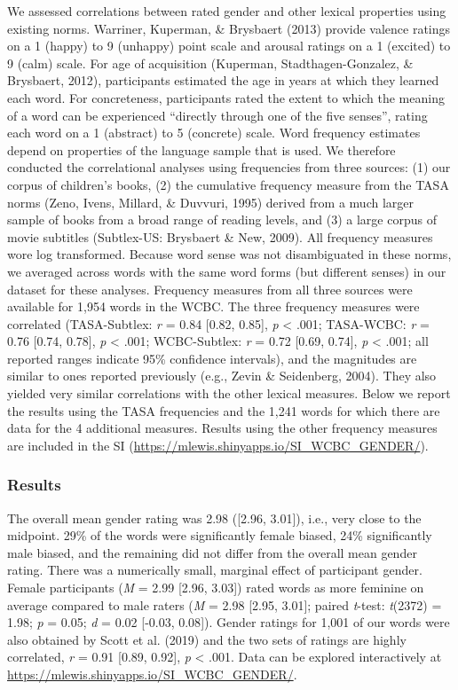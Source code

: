 \documentclass[
  english,
  ,man,floatsintext]{apa6}
\begin{document}
We assessed correlations between rated gender and other lexical properties using existing norms. Warriner, Kuperman, \& Brysbaert (2013) provide valence ratings on a 1 (happy) to 9 (unhappy) point scale and arousal ratings on a 1 (excited) to 9 (calm) scale. For age of acquisition (Kuperman, Stadthagen-Gonzalez, \& Brysbaert, 2012), participants estimated the age in years at which they learned each word. For concreteness, participants rated the extent to which the meaning of a word can be experienced \enquote{directly through one of the five senses}, rating each word on a 1 (abstract) to 5 (concrete) scale. Word frequency estimates depend on properties of the language sample that is used. We therefore conducted the correlational analyses using frequencies from three sources: (1) our corpus of children's books, (2) the cumulative frequency measure from the TASA norms (Zeno, Ivens, Millard, \& Duvvuri, 1995) derived from a much larger sample of books from a broad range of reading levels, and (3) a large corpus of movie subtitles (Subtlex-US: Brysbaert \& New, 2009). All frequency measures wore log transformed. Because word sense was not disambiguated in these norms, we averaged across words with the same word forms (but different senses) in our dataset for these analyses. Frequency measures from all three sources were available for 1,954 words in the WCBC. The three frequency measures were correlated (TASA-Subtlex: \emph{r} = 0.84 {[}0.82, 0.85{]}, \emph{p} \textless{} .001; TASA-WCBC: \emph{r} = 0.76 {[}0.74, 0.78{]}, \emph{p} \textless{} .001; WCBC-Subtlex: \emph{r} = 0.72 {[}0.69, 0.74{]}, \emph{p} \textless{} .001; all reported ranges indicate 95\% confidence intervals), and the magnitudes are similar to ones reported previously (e.g., Zevin \& Seidenberg, 2004). They also yielded very similar correlations with the other lexical measures. Below we report the results using the TASA frequencies and the 1,241 words for which there are data for the 4 additional measures. Results using the other frequency measures are included in the SI (\url{https://mlewis.shinyapps.io/SI_WCBC_GENDER/}).

\hypertarget{results}{%
\subsubsection{Results}\label{results}}

The overall mean gender rating was 2.98 ({[}2.96, 3.01{]}), i.e., very close to the midpoint. 29\% of the words were significantly female biased, 24\% significantly male biased, and the remaining did not differ from the overall mean gender rating. There was a numerically small, marginal effect of participant gender. Female participants (\emph{M} = 2.99 {[}2.96, 3.03{]}) rated words as more feminine on average compared to male raters (\emph{M} = 2.98 {[}2.95, 3.01{]}; paired \emph{t}-test: \emph{t}(2372) = 1.98; \emph{p} = 0.05; \emph{d} = 0.02 {[}-0.03, 0.08{]}). Gender ratings for 1,001 of our words were also obtained by Scott et al. (2019) and the two sets of ratings are highly correlated, \emph{r} = 0.91 {[}0.89, 0.92{]}, \emph{p} \textless{} .001. Data can be explored interactively at \url{https://mlewis.shinyapps.io/SI_WCBC_GENDER/}.
\end{document}
